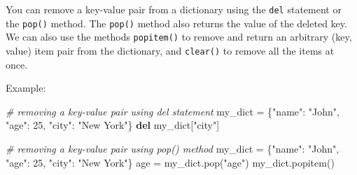 \documentclass[11pt]{article}
\newenvironment{Shaded}{}{}
\newcommand{\KeywordTok}[1]{\textcolor[rgb]{0.00,0.44,0.13}{\textbf{{#1}}}}
\newcommand{\DecValTok}[1]{\textcolor[rgb]{0.25,0.63,0.44}{{#1}}}
\newcommand{\StringTok}[1]{\textcolor[rgb]{0.25,0.44,0.63}{{#1}}}
\newcommand{\CommentTok}[1]{\textcolor[rgb]{0.38,0.63,0.69}{\textit{{#1}}}}
\newcommand{\NormalTok}[1]{{#1}}
\newcommand{\OperatorTok}[1]{\textcolor[rgb]{0.40,0.40,0.40}{{#1}}}
\begin{document}
You can remove a key-value pair from a dictionary using the \texttt{del}
statement or the \texttt{pop()} method. The \texttt{pop()} method also
returns the value of the deleted key. We can also use the methods
\texttt{popitem()} to remove and return an arbitrary (key, value) item
pair from the dictionary, and \texttt{clear()} to remove all the items
at once.

Example:

\begin{Shaded}
\begin{Highlighting}[]
\CommentTok{\# removing a key{-}value pair using del statement}
\NormalTok{my\_dict }\OperatorTok{=}\NormalTok{ \{}\StringTok{"name"}\NormalTok{: }\StringTok{"John"}\NormalTok{, }\StringTok{"age"}\NormalTok{: }\DecValTok{25}\NormalTok{, }\StringTok{"city"}\NormalTok{: }\StringTok{"New York"}\NormalTok{\}}
\KeywordTok{del}\NormalTok{ my\_dict[}\StringTok{"city"}\NormalTok{]}

\CommentTok{\# removing a key{-}value pair using pop() method}
\NormalTok{my\_dict }\OperatorTok{=}\NormalTok{ \{}\StringTok{"name"}\NormalTok{: }\StringTok{"John"}\NormalTok{, }\StringTok{"age"}\NormalTok{: }\DecValTok{25}\NormalTok{, }\StringTok{"city"}\NormalTok{: }\StringTok{"New York"}\NormalTok{\}}
\NormalTok{age }\OperatorTok{=}\NormalTok{ my\_dict.pop(}\StringTok{"age"}\NormalTok{)}
\NormalTok{my\_dict.popitem()}
\end{Highlighting}
\end{Shaded}


    
    
    
\end{document}
